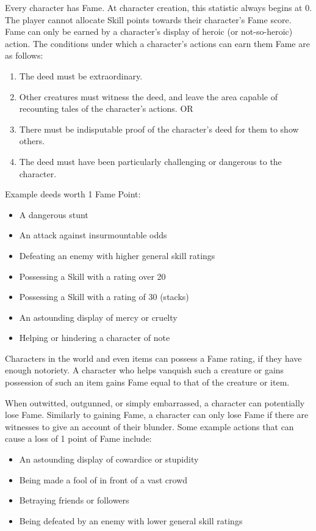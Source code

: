 \documentclass[oneside]{book}
\begin{document}
\begin{multicols}{2}
Every character has Fame. At character creation, this statistic always begins at 0. The player cannot allocate Skill points towards their character's Fame score. Fame can only be earned by a character's display of heroic (or not-so-heroic) action. The conditions under which a character's actions can earn them Fame are as follows:
	
	\begin{enumerate}
		\item{ \small The deed must be extraordinary.}
		\item{ \small Other creatures must witness the deed, and leave the area capable of recounting tales of the character's actions. OR}
		\item{ \small There must be indisputable proof of the character's deed for them to show others.}
		\item{ \small The deed must have been particularly challenging or dangerous to the character.}
\end{enumerate}

Example deeds worth 1 Fame Point:
\begin{itemize}
\setlength\itemsep{0em}
\item{ \small A dangerous stunt}
\item{ \small An attack against insurmountable odds}
\item{ \small Defeating an enemy with higher general skill ratings}
\item{ \small Possessing a Skill with a rating over 20}
\item{ \small Possessing a Skill with a rating of 30 (stacks)}
\item{ \small An astounding display of mercy or cruelty}
\item{ \small Helping or hindering a character of note}
\end{itemize}

Characters in the world and even items can possess a Fame rating, if they have enough notoriety. A character who helps vanquish such a creature or gains possession of such an item gains Fame equal to that of the creature or item.

When outwitted, outgunned, or simply embarrassed, a character can potentially lose Fame. Similarly to gaining Fame, a character can only lose Fame if there are witnesses to give an account of their blunder. Some example actions that can cause a loss of 1 point of Fame include:
\begin{itemize}
\setlength\itemsep{0em}
\item{ \small An astounding display of cowardice or stupidity}
\item{ \small Being made a fool of in front of a vast crowd}
\item{ \small Betraying friends or followers}
\item{ \small Being defeated by an enemy with lower general skill ratings}
\end{itemize}


\end{multicols}
\end{document}
